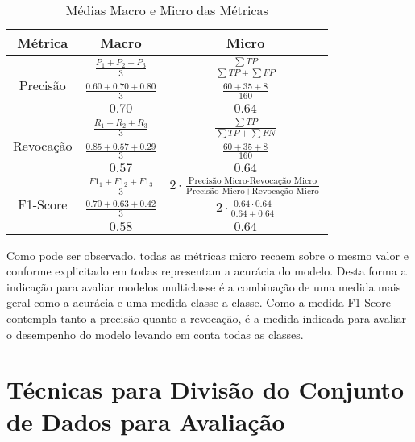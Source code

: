 \begin{table}[h]
\centering
\caption{Médias Macro e Micro das Métricas}
\label{tab:macro_micro_averages}
\begin{tabular}{|c|c|c|}
\hline
\textbf{Métrica} & \textbf{Macro} & \textbf{Micro} \\
\hline
\multirow{3}{*}{Precisão} & \(\frac{P_1 + P_2 + P_3}{3}\) & \(\frac{\sum TP}{\sum TP + \sum FP}\) \\
 & \(\frac{0.60 + 0.70 + 0.80}{3}\) & \(\frac{60 + 35 + 8}{160}\) \\
 & \(0.70\) & \(0.64\) \\
\hline
\multirow{3}{*}{Revocação} & \(\frac{R_1 + R_2 + R_3}{3}\) & \(\frac{\sum TP}{\sum TP + \sum FN}\) \\
 & \(\frac{0.85 + 0.57 + 0.29}{3}\) & \(\frac{60 + 35 + 8}{160}\) \\
 & \(0.57\) & \(0.64\) \\
\hline
\multirow{3}{*}{F1-Score} & \(\frac{F1_1 + F1_2 + F1_3}{3}\) & \(2 \cdot \frac{\text{Precisão Micro} \cdot \text{Revocação Micro}}{\text{Precisão Micro} + \text{Revocação Micro}}\) \\
 & \(\frac{0.70 + 0.63 + 0.42}{3}\) & \(2 \cdot \frac{0.64 \cdot 0.64}{0.64 + 0.64}\) \\
 & \(0.58\) & \(0.64\) \\
\hline
\end{tabular}
\end{table}

Como pode ser observado, todas as métricas micro recaem sobre o mesmo valor e conforme explicitado em \cite{grandini2020metrics} todas representam a acurácia do modelo.  Desta forma a indicação para avaliar modelos multiclasse é a combinação de uma medida mais geral como a acurácia e uma medida classe a classe.  Como a medida F1-Score contempla tanto a precisão quanto a revocação, é a medida indicada para avaliar o desempenho do modelo levando em conta todas as classes.

\section{Técnicas para Divisão do Conjunto de Dados para Avaliação}


